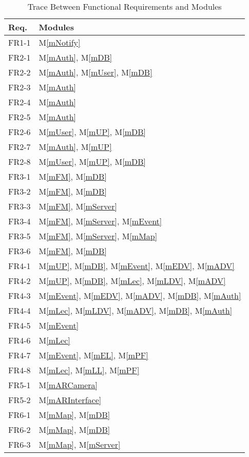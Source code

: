\documentclass[12pt, titlepage]{article}
\newcommand{\mref}[1]{M\ref{#1}}
\begin{document}
\begin{table}[H]
\centering
\begin{tabular}{p{} p{}}
\toprule
\textbf{Req.} & \textbf{Modules}\\
\midrule
FR1-1 & \mref{mNotify}\\
FR2-1 & \mref{mAuth}, \mref{mDB}\\
FR2-2 & \mref{mAuth}, \mref{mUser}, \mref{mDB}\\
FR2-3 & \mref{mAuth}\\
FR2-4 & \mref{mAuth}\\
FR2-5 & \mref{mAuth}\\
FR2-6 & \mref{mUser}, \mref{mUP}, \mref{mDB}\\
FR2-7 & \mref{mAuth}, \mref{mUP}\\
FR2-8 & \mref{mUser}, \mref{mUP}, \mref{mDB}\\
FR3-1 & \mref{mFM}, \mref{mDB}\\
FR3-2 & \mref{mFM}, \mref{mDB}\\
FR3-3 & \mref{mFM}, \mref{mServer}\\
FR3-4 & \mref{mFM}, \mref{mServer}, \mref{mEvent}\\
FR3-5 & \mref{mFM}, \mref{mServer}, \mref{mMap}\\
FR3-6 & \mref{mFM}, \mref{mDB}\\
FR4-1 & \mref{mUP}, \mref{mDB}, \mref{mEvent}, \mref{mEDV}, \mref{mADV}\\
FR4-2 & \mref{mUP}, \mref{mDB}, \mref{mLec}, \mref{mLDV}, \mref{mADV}\\
FR4-3 & \mref{mEvent}, \mref{mEDV}, \mref{mADV}, \mref{mDB}, \mref{mAuth}\\
FR4-4 & \mref{mLec}, \mref{mLDV}, \mref{mADV}, \mref{mDB}, \mref{mAuth}\\
FR4-5 & \mref{mEvent}\\
FR4-6 & \mref{mLec}\\
FR4-7 & \mref{mEvent}, \mref{mEL}, \mref{mPF}\\
FR4-8 & \mref{mLec}, \mref{mLL}, \mref{mPF}\\
FR5-1 & \mref{mARCamera}\\
FR5-2 & \mref{mARInterface}\\
FR6-1 & \mref{mMap}, \mref{mDB}\\
FR6-2 & \mref{mMap}, \mref{mDB}\\
FR6-3 & \mref{mMap}, \mref{mServer}\\
\bottomrule
\end{tabular}
\caption{Trace Between Functional Requirements and Modules}
\label{TblFRT}
\end{table}
\end{document}

